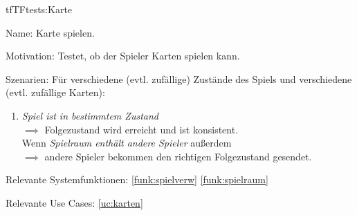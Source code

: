 \begin{description}[leftmargin=5em, style=sameline]
\begin{lhp}{tf}{TF}{tests:Karte}
	\item [Name:] Karte spielen.
	\item [Motivation:] Testet, ob der Spieler Karten spielen kann.
	\item [Szenarien:] \hfill
		Für verschiedene (evtl. zufällige) Zustände des Spiels und verschiedene (evtl. zufällige Karten):
		\begin{enumerate}
			\item \textit{Spiel ist in bestimmtem Zustand} \\
			$\implies$ Folgezustand wird erreicht und ist konsistent. \\
			Wenn \textit{Spielraum enthält andere Spieler} außerdem \\
			$\implies$ andere Spieler bekommen den richtigen Folgezustand gesendet.
		\end{enumerate}
	\item [Relevante Systemfunktionen:] \ref{funk:spielverw} \ref{funk:spielraum}
	\item [Relevante Use Cases:] \ref{uc:karten}
\end{lhp}

\end{description}




